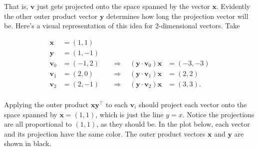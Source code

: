 \documentclass[
  letterpaper,
  DIV=11,
  numbers=noendperiod]{scrreprt}
\begin{document}
That is, \(\mathbf{v}\) just gets projected onto the space spanned by
the vector \(\mathbf{x}\). Evidently the other outer product vector
\(\mathbf{y}\) determines how long the projection vector will be. Here's
a visual representation of this idea for 2-dimensional vectors. Take

\begin{align*}
\mathbf{x} &= (1, 1) \\
\mathbf{y} &= (1, -1) \\
\mathbf{v}_0 &= (-1, 2) \quad &\Longrightarrow \quad (\mathbf{y} \cdot \mathbf{v}_0) \mathbf{x} &= (-3, -3) \\
\mathbf{v}_1 &= (2, 0) \quad &\Longrightarrow \quad (\mathbf{y} \cdot \mathbf{v}_1) \mathbf{x} &= (2, 2) \\
\mathbf{v}_2 &= (2, -1) \quad &\Longrightarrow \quad (\mathbf{y} \cdot \mathbf{v}_2) \mathbf{x} &= (3, 3). \\
\end{align*}

Applying the outer product \(\mathbf{x} \mathbf{y}^\top\) to each
\(\mathbf{v}_i\) should project each vector onto the space spanned by
\(\mathbf{x}=(1, 1)\), which is just the line \(y=x\). Notice the
projections are all proportional to \((1, 1)\), as they should be. In
the plot below, each vector and its projection have the same color. The
outer product vectors \(\mathbf{x}\) and \(\mathbf{y}\) are shown in
black.
\end{document}
